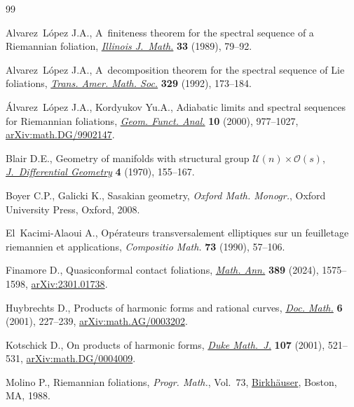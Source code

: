 \documentclass[pdftex]{sigma}
\numberwithin{equation}{section}
\theoremstyle{definition}
\begin{document}
\begin{thebibliography}{99}
\footnotesize\itemsep=0pt

Alvarez~L\'opez J.A., A~finiteness theorem for the spectral sequence of a
 {R}iemannian foliation,
 \href{https://doi.org/10.1215/ijm/1255988806}{\textit{Illinois J.~Math.}}
 \textbf{33} (1989), 79--92.

Alvarez~L\'opez J.A., A~decomposition theorem for the spectral sequence of
 {L}ie foliations, \href{https://doi.org/10.2307/2154083}{\textit{Trans. Amer.
 Math. Soc.}} \textbf{329} (1992), 173--184.

\'Alvarez~L\'opez J.A., Kordyukov Yu.A., Adiabatic limits and spectral sequences
 for {R}iemannian foliations,
 \href{https://doi.org/10.1007/PL00001653}{\textit{Geom. Funct. Anal.}}
 \textbf{10} (2000), 977--1027,
 \href{http://arxiv.org/abs/math.DG/9902147}{arXiv:math.DG/9902147}.

Blair D.E., Geometry of manifolds with structural group {$ \mathcal{U}(n)\times
 \mathcal{O}(s)$},
 \href{https://doi.org/10.4310/jdg/1214429380}{\textit{J.~Differential
 Geometry}} \textbf{4} (1970), 155--167.

Boyer C.P., Galicki K., Sasakian geometry, \textit{Oxford Math. Monogr.}, Oxford
 University Press, Oxford, 2008.

El~Kacimi-Alaoui A., Op\'erateurs transversalement elliptiques sur un
 feuilletage riemannien et applications, \textit{Compositio Math.} \textbf{73}
 (1990), 57--106.

Finamore D., Quasiconformal contact foliations,
 \href{https://doi.org/10.1007/s00208-023-02687-7}{\textit{Math. Ann.}}
 \textbf{389} (2024), 1575--1598,
 \href{http://arxiv.org/abs/2301.01738}{arXiv:2301.01738}.

Huybrechts D., Products of harmonic forms and rational curves,
 \href{https://doi.org/10.4171/DM/102}{\textit{Doc. Math.}} \textbf{6} (2001),
 227--239, \href{http://arxiv.org/abs/math.AG/0003202}{arXiv:math.AG/0003202}.

Kotschick D., On products of harmonic forms,
 \href{https://doi.org/10.1215/S0012-7094-01-10734-5}{\textit{Duke Math.~J.}}
 \textbf{107} (2001), 521--531,
 \href{http://arxiv.org/abs/math.DG/0004009}{arXiv:math.DG/0004009}.

Molino P., Riemannian foliations, \textit{Progr. Math.}, Vol.~73,
 \href{https://doi.org/10.1007/978-1-4684-8670-4}{Birkh\"auser}, Boston, MA,
 1988.


\end{thebibliography}
\end{document}
